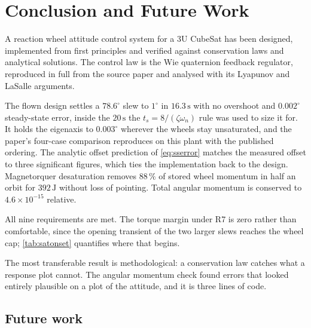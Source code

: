\documentclass[conference,10pt,a4paper]{IEEEtran}
\newcommand{\unit}[1]{\ensuremath{\,\mathrm{#1}}}
\begin{document}
\section{Conclusion and Future Work}
\label{sec:conclusion}

A reaction wheel attitude control system for a 3U CubeSat has been designed,
implemented from first principles and verified against conservation laws and
analytical solutions. The control law is the Wie quaternion feedback regulator,
reproduced in full from the source paper and analysed with its Lyapunov and
LaSalle arguments.

The flown design settles a $78.6^\circ$ slew to $1^\circ$ in $16.3\unit{s}$ with
no overshoot and $0.002^\circ$ steady-state error, inside the $20\unit{s}$ the
$t_s=8/(\zeta\omega_n)$ rule was used to size it for. It holds the eigenaxis to
$0.003^\circ$ wherever the wheels stay unsaturated, and the paper's four-case
comparison reproduces on this plant with the published ordering. The analytic
offset prediction of \cref{eq:sserror} matches the measured offset to three
significant figures, which ties the implementation back to the design.
Magnetorquer desaturation removes $88\,\%$ of stored wheel momentum in half an
orbit for $392\unit{J}$ without loss of pointing. Total angular momentum is
conserved to $4.6\times10^{-15}$ relative.

All nine requirements are met. The torque margin under R7 is zero rather than
comfortable, since the opening transient of the two larger slews reaches the
wheel cap; \cref{tab:satonset} quantifies where that begins.

The most transferable result is methodological: a conservation law catches what
a response plot cannot. The angular momentum check found errors that looked
entirely plausible on a plot of the attitude, and it is three lines of code.

\subsection{Future work}
\label{sec:future}
\end{document}
